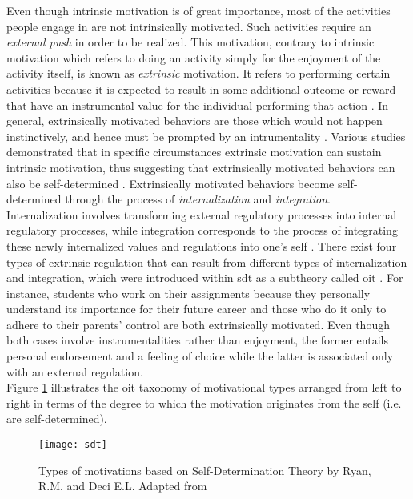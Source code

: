 Even though intrinsic motivation is of great importance, most of the activities people engage in are not intrinsically motivated. Such activities require an \textit{external push} in order to be realized. This motivation, contrary to intrinsic motivation which refers to doing an activity simply for the enjoyment of the activity itself, is known as \textit{extrinsic} motivation. It refers to performing certain activities because it is expected to result in some additional outcome or reward that have an instrumental value for the individual performing that action \cite{ryan2000self}. In general, extrinsically motivated behaviors are those which would not happen instinctively, and hence must be prompted by an intrumentality \cite{deci1994promoting}. Various studies demonstrated that in specific circumstances extrinsic motivation can sustain intrinsic motivation, thus suggesting that extrinsically motivated behaviors can also be self-determined \cite{deci1994promoting}. Extrinsically motivated behaviors become self-determined through the process of \textit{internalization} and \textit{integration}.\\ Internalization involves transforming external regulatory processes into internal regulatory processes, while integration corresponds to the process of integrating these newly internalized values and regulations into one's self \cite{deci1994promoting}. There exist four types of extrinsic regulation that can result from different types of internalization and integration, which were introduced within \acrshort{sdt} as a subtheory called \acrfull{oit} \cite{deci1994promoting, ryan2000intrinsic, ryan2000self}. For instance, students who work on their assignments because they personally understand its importance for their future career and those who do it only to adhere to their parents' control are both extrinsically motivated. Even though both cases involve instrumentalities rather than enjoyment, the former entails personal endorsement and a feeling of choice while the latter is associated only with an external regulation.\\
Figure \ref{fig:tax} illustrates the \acrshort{oit} taxonomy of motivational types arranged from left to right in terms of the degree to which the motivation originates from the self (i.e. are self-determined).\\ 
\begin{figure}[h]
    \centering
    \texttt{[image: sdt]}
    \caption[Types of Motivations]{Types of motivations based on Self-Determination  Theory by Ryan, R.M. and Deci E.L. Adapted from  \cite{ryan2000intrinsic}}
    \label{fig:tax}
\end{figure}\\
